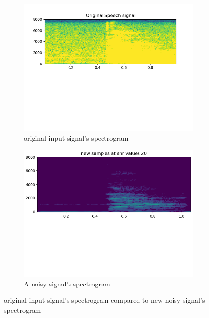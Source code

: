 \documentclass[11pt,a4paper,titlepage]{report}
\begin{document}
\begin{figure}[h!]
	\centering
	\begin{subfigure}{.5\textwidth}
		\centering
		\includegraphics[width=0.91\linewidth]{rapport12}
		\caption{original input signal's spectrogram}
		\label{fig:sub1}
	\end{subfigure}%
	\begin{subfigure}{.5\textwidth}
		\centering
		\includegraphics[width=0.91\linewidth]{rapport13}
		\caption{A noisy signal's spectrogram}
		\label{fig:sub2}
	\end{subfigure}
	\caption{original input signal's spectrogram compared to new noisy signal's spectrogram }
	\label{fig:rapport11}
\end{figure}
\end{document}
